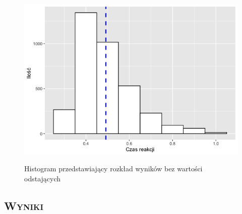 \documentclass[12pt,a4paper,final,oneside,onecolumn,titlepage]{article}
\begin{document}
\begin{figure}[H]
\centering
\caption{Histogram przedstawiający rozkład wyników bez wartości odstających}
\includegraphics[scale=0.5]{hist2}
\label{Rysunek}
\end{figure}
\begin{center}
\section*{\large{\textbf{\textsc{Wyniki}}}}
\end{center}
\end{document}
